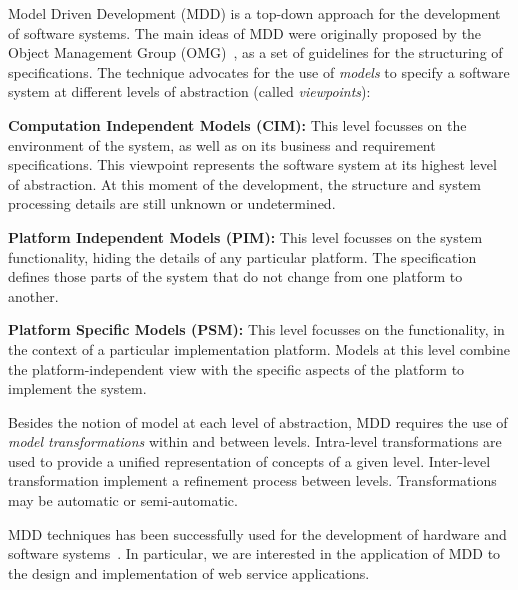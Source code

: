 
Model Driven Development (MDD) is a top-down approach for the development of software systems. 
The main ideas of MDD were originally proposed by the Object Management Group (OMG)~\cite{mda}, as a set of guidelines for the structuring of specifications.
The technique advocates for the use of \textit{models} to specify a software system at different levels of abstraction (called \textit{viewpoints}):

\begin{trivlist}
\item \textbf{Computation Independent Models (CIM):} This level focusses on the
environment of the system, as well as on its business and requirement specifications. 
This viewpoint represents the software system at its highest level of abstraction. 
At this moment of the development, the structure and system processing details are still unknown or undetermined. 
 
\item \textbf{Platform Independent Models (PIM):} This level focusses on the system functionality, hiding the details of any particular platform. 
The specification defines those parts of the system that do not change from one platform to another. 

\item \textbf{Platform Specific Models (PSM):} This level focusses on the functionality, in the context of a particular implementation platform.
Models at this level combine the platform-independent view with the specific aspects of the platform to implement the system.  
\end{trivlist}

Besides the notion of model at each level of abstraction, MDD requires the use of \textit{model transformations} within and between levels.
Intra-level transformations are used to provide a unified representation of concepts of a given level.
Inter-level transformation implement a refinement process between levels.
Transformations may be automatic or semi-automatic.

MDD techniques has been successfully used for the development of hardware and software systems~\cite{MDDvariosAqui}. 
In particular, we are interested in the application of MDD to the design and implementation of web service applications.

